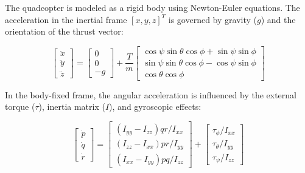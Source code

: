The quadcopter is modeled as a rigid body using Newton-Euler equations. The acceleration in the inertial frame $[x,y,z]^T$ is governed by gravity ($g$) and the orientation of the thrust vector:

$$\begin{bmatrix} \ddot{x} \\ \ddot{y} \\ \ddot{z} \end{bmatrix} = \begin{bmatrix} 0 \\ 0 \\ -g \end{bmatrix} + \frac{T}{m} \begin{bmatrix} \cos\psi \sin\theta \cos\phi + \sin\psi \sin\phi \\ \sin\psi \sin\theta \cos\phi - \cos\psi \sin\phi \\ \cos\theta \cos\phi \end{bmatrix}$$

In the body-fixed frame, the angular acceleration is influenced by the external torque ($\tau$), inertia matrix ($I$), and gyroscopic effects:

$$\begin{bmatrix} \dot{p} \\ \dot{q} \\ \dot{r} \end{bmatrix} = \begin{bmatrix} (I_{yy} - I_{zz})qr/I_{xx} \\ (I_{zz} - I_{xx})pr/I_{yy} \\ (I_{xx} - I_{yy})pq/I_{zz} \end{bmatrix} + \begin{bmatrix} \tau_\phi/I_{xx} \\ \tau_\theta/I_{yy} \\ \tau_\psi/I_{zz} \end{bmatrix}$$

